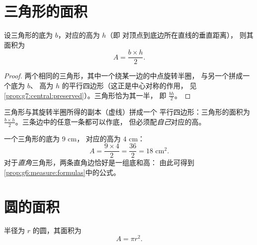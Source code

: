 \section{三角形的面积}

\begin{theorem}[三角形]\label{thm:g7:areas:triangle}
设三角形的底为 $b$，对应的高为 $h$（即
对顶点到底边所在直线的垂直距离），
则其面积为
\[
A = \frac{b \times h}{2} .
\]
\end{theorem}

\begin{proof}
两个相同的三角形，其中一个绕某一边的中点旋转半圈，
与另一个拼成一个底为 $b$、
高为 $h$ 的平行四边形（这正是中心对称的作用，
见\cref{prop:g7:central:preserved}）。三角形恰为其一半，
即 $\frac{bh}{2}$。
\end{proof}

\begin{omfigure}

{\small 三角形与其旋转半圈所得的副本（虚线）拼成一个
平行四边形：三角形的面积为 $\frac{b\times h}{2}$。三条边中的任意一条都可以作底，
但必须配\emph{自己}对应的高。}
\end{omfigure}

\begin{example}\label{ex:g7:areas:triangle}
一个三角形的底为 $9$ cm，
对应的高为 $4$ cm：
\[
A = \frac{9 \times 4}{2} = \frac{36}{2} = 18 \text{ cm}^2 .
\]
对于\emph{直角}三角形，两条直角边恰好是一组底和高：
由此可得到\cref{prop:g6:measure:formulas}中的公式。
\end{example}

\section{圆的面积}

\begin{theorem}[圆]\label{thm:g7:areas:disk}
半径为 $r$ 的圆，其面积为
\[
A = \pi r^2 .
\]
\end{theorem}

